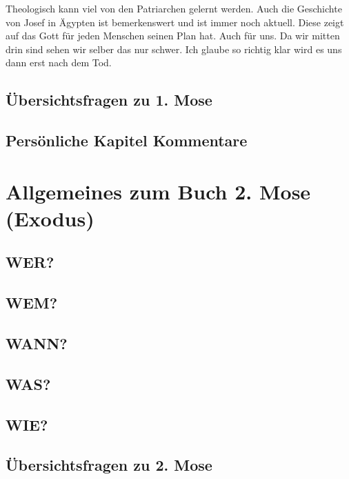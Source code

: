 Theologisch kann viel von den Patriarchen gelernt werden. Auch die Geschichte von Josef in Ägypten ist bemerkenswert und ist immer noch aktuell. Diese zeigt auf das Gott für jeden Menschen seinen Plan hat. Auch für uns. Da wir mitten drin sind sehen wir selber das nur schwer. Ich glaube so richtig klar wird es uns dann erst nach dem Tod.
\subsection{Übersichtsfragen zu 1. Mose}
    
\subsection{Persönliche Kapitel Kommentare}
    
    
    
    
    
    
\section{Allgemeines zum Buch 2. Mose (Exodus)}
\subsection{WER?}
\subsection{WEM?}
\subsection{WANN?}
\subsection{WAS?}
\subsection{WIE?}
\subsection{Übersichtsfragen zu 2. Mose}
    
